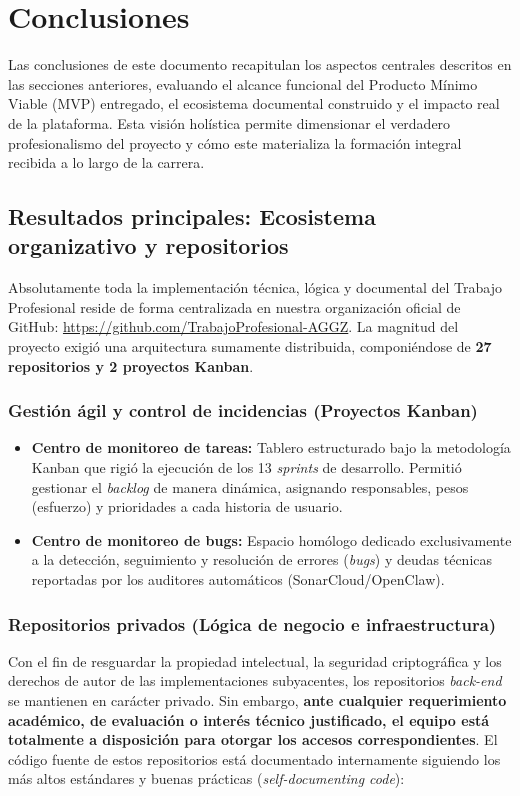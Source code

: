 \section{Conclusiones}

Las conclusiones de este documento recapitulan los aspectos centrales descritos en las secciones anteriores, evaluando el alcance funcional del Producto Mínimo Viable (MVP) entregado, el ecosistema documental construido y el impacto real de la plataforma. Esta visión holística permite dimensionar el verdadero profesionalismo del proyecto y cómo este materializa la formación integral recibida a lo largo de la carrera.

\subsection{Resultados principales: Ecosistema organizativo y repositorios}

Absolutamente toda la implementación técnica, lógica y documental del Trabajo Profesional reside de forma centralizada en nuestra organización oficial de GitHub: \url{https://github.com/TrabajoProfesional-AGGZ}. La magnitud del proyecto exigió una arquitectura sumamente distribuida, componiéndose de \textbf{27 repositorios y 2 proyectos Kanban}.

\subsubsection{Gestión ágil y control de incidencias (Proyectos Kanban)}
\begin{itemize}
    \item \textbf{Centro de monitoreo de tareas:} Tablero estructurado bajo la metodología Kanban que rigió la ejecución de los 13 \textit{sprints} de desarrollo. Permitió gestionar el \textit{backlog} de manera dinámica, asignando responsables, pesos (esfuerzo) y prioridades a cada historia de usuario.
    \item \textbf{Centro de monitoreo de bugs:} Espacio homólogo dedicado exclusivamente a la detección, seguimiento y resolución de errores (\textit{bugs}) y deudas técnicas reportadas por los auditores automáticos (SonarCloud/OpenClaw).
\end{itemize}

\subsubsection{Repositorios privados (Lógica de negocio e infraestructura)}
Con el fin de resguardar la propiedad intelectual, la seguridad criptográfica y los derechos de autor de las implementaciones subyacentes, los repositorios \textit{back-end} se mantienen en carácter privado. Sin embargo, \textbf{ante cualquier requerimiento académico, de evaluación o interés técnico justificado, el equipo está totalmente a disposición para otorgar los accesos correspondientes}. El código fuente de estos repositorios está documentado internamente siguiendo los más altos estándares y buenas prácticas (\textit{self-documenting code}):


